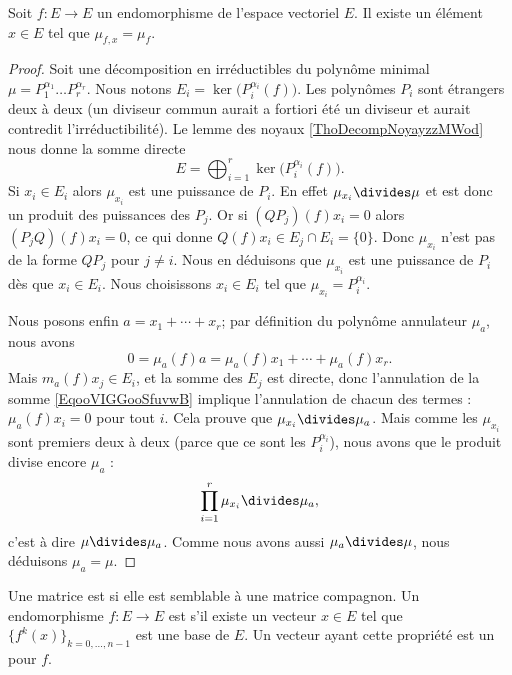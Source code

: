 \begin{lemma}\label{LemSYsJJj}
    Soit \( f\colon E\to E\) un endomorphisme de l'espace vectoriel \( E\). Il existe un élément \( x\in E\) tel que \( \mu_{f,x}=\mu_f\).
\end{lemma}

\begin{proof}
    Soit une décomposition en irréductibles du polynôme minimal \( \mu=P_1^{\alpha_1}\ldots P_r^{\alpha_r}\). Nous notons \( E_i=\ker\big( P_i^{\alpha_i}(f) \big)\). Les polynômes \( P_i\) sont étrangers deux à deux (un diviseur commun aurait a fortiori été un diviseur et aurait contredit l'irréductibilité). Le lemme des noyaux \ref{ThoDecompNoyayzzMWod} nous donne la somme directe
    \begin{equation}
        E=\bigoplus_{i=1}^r\ker\big( P_i^{\alpha_i}(f) \big).
    \end{equation}
    Si \( x_i\in E_i\) alors \( \mu_{x_i}\) est une puissance de \( P_i\). En effet \( \mu_{x_i}\divides \mu\) et est donc un produit des puissances des \( P_j\). Or si \( (QP_j)(f)x_i=0\) alors \( (P_jQ)(f)x_i=0\), ce qui donne \( Q(f)x_i\in E_j\cap E_i=\{ 0 \}\). Donc \( \mu_{x_i}\) n'est pas de la forme \( QP_j\) pour \( j\neq i\). Nous en déduisons que \( \mu_{x_i}\) est une puissance de \( P_i\) dès que \( x_i\in E_i\). Nous choisissons \( x_i\in E_i\) tel que \( \mu_{x_i}=P_i^{\alpha_i}\).

    Nous posons enfin \( a=x_1+\cdots +x_r\); par définition du polynôme annulateur \( \mu_a\), nous avons
    \begin{equation}        \label{EqooVIGGooSfuvwB}
        0=\mu_a(f)a=\mu_a(f)x_1+\cdots +\mu_a(f)x_r.
    \end{equation}
    Mais \( m_a(f)x_j\in E_i\), et la somme des \( E_j\) est directe, donc l'annulation de la somme \eqref{EqooVIGGooSfuvwB} implique l'annulation de chacun des termes : \( \mu_a(f)x_i=0\) pour tout \( i\). Cela prouve que \( \mu_{x_i}\divides \mu_a\). Mais comme les \( \mu_{x_i}\) sont premiers deux à deux (parce que ce sont les \( P_i^{\alpha_i}\)), nous avons que le produit divise encore \( \mu_a\) :
    \begin{equation}
        \prod_{i=1}^r\mu_{x_i}\divides \mu_a,
    \end{equation}
    c'est à dire \( \mu\divides \mu_a\). Comme nous avons aussi \( \mu_a\divides \mu\), nous déduisons \( \mu_a=\mu\).
\end{proof}

\begin{definition}      \label{DEFooFEIFooNSGhQE}
    Une matrice est  si elle est semblable à une matrice compagnon. Un endomorphisme \( f\colon E\to E\) est  s'il existe un vecteur \( x\in E\) tel que \( \{ f^k(x) \}_{k=0,\ldots, n-1} \) est une base de \( E\). Un vecteur ayant cette propriété est un  pour \( f\).
\end{definition}

